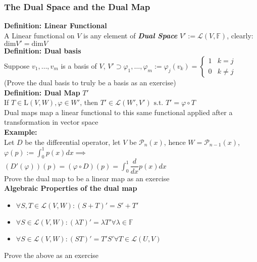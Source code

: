 \documentclass{article}
\newcommand{\F}{\mathbb{F}}
\newcommand{\st}{\mbox{ s.t. }}
\newcommand{\0}{{\bf{0}}}
\begin{document}
\subsubsection{The Dual Space and the Dual Map}
\textbf{Definition: Linear Functional}\\
A Linear functional on $V$ is any element of \textit{\textbf{Dual Space}} $V':=\mathcal{L}(V,\F)$, clearly: $\mbox{dim}V'=\mbox{dim}V$\\
\textbf{Definition: Dual basis}\\
Suppose $v_1,\dots,v_m$ is a basis of $V$, $V'\supset\varphi_1,\dots,\varphi_m:=\varphi_j(v_k)=\begin{cases}
    1&k=j\\
    0&k\neq j
\end{cases}$\\
\null\hfill{(Prove the dual basis to truly be a basis as an exercise)}\\
\textbf{Definition: Dual Map} $T'$\\
If $T\in\mbox{L}(V,W),\varphi\in W'\mbox{, then }T'\in\mathcal{L}(W',V')\st T'=\varphi\circ T$\\
Dual maps map a linear functional to this same functional applied after a transformation in vector space\\
\textbf{Example:}\\
Let $D$ be the differential operator, let $V$ be $\mathcal{P}_n(x)$, hence $W=\mathcal{P}_{n-1}(x)$, $\varphi(p):=\displaystyle\int_0^1p(x)dx\implies$\\ 
$(D'(\varphi))(p)=(\varphi\circ D)(p)=\displaystyle\int_0^1\dfrac{d}{dx}p(x)dx$\\
\null\hfill{Prove the dual map to be a linear map as an exercise}\\
\textbf{Algebraic Properties of the dual map}
\begin{itemize}
    \item $\forall S,T\in\mathcal{L}(V,W):(S+T)'=S'+T'$
    \item $\forall S\in\mathcal{L}(V,W):(\lambda T)'=\lambda T'\forall\lambda\in\F$
    \item $\forall S\in\mathcal{L}(V,W):(ST)'=T'S'\forall T\in\mathcal{L}(U,V)$
\end{itemize}
\null\hfill{Prove the above as an exercise}
\end{document}
